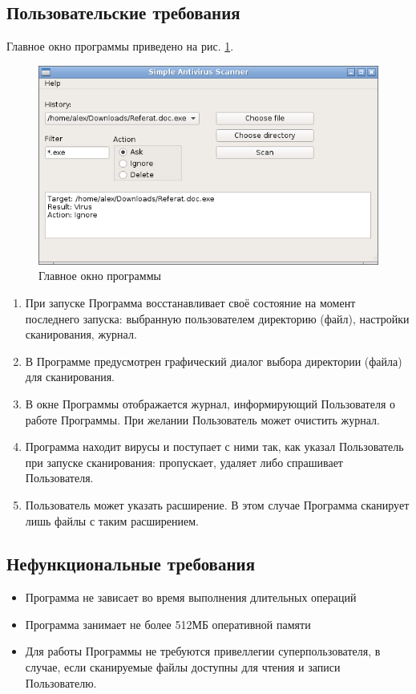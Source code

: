 \subsection{Пользовательские требования}
Главное окно программы приведено на рис. \ref{fig:mainwindow}.
\begin{figure}
\centering
\includegraphics[width=\textwidth]{mainwindow}
\caption{Главное окно программы}
\label{fig:mainwindow}
\end{figure}
\begin{enumerate}
\item При запуске Программа восстанавливает своё состояние на момент последнего
запуска: выбранную пользователем директорию (файл), настройки сканирования,
журнал.
\item В Программе предусмотрен графический диалог выбора директории (файла) для
сканирования.
\item В окне Программы отображается журнал, информирующий Пользователя о работе
Программы. При желании Пользователь может очистить журнал.
\item Программа находит вирусы и поступает с ними так, как указал Пользователь
при запуске сканирования: пропускает, удаляет либо спрашивает Пользователя.
\item Пользователь может указать расширение. В этом случае Программа сканирует
лишь файлы с таким расширением.
\end{enumerate}
\subsection{Нефункциональные требования}
\begin{itemize}
\item Программа не зависает во время выполнения длительных операций
\item Программа занимает не более 512МБ оперативной памяти
\item Для работы Программы не требуются привеллегии суперпользователя, в случае,
если сканируемые файлы доступны для чтения и записи Пользователю.
\end{itemize}
